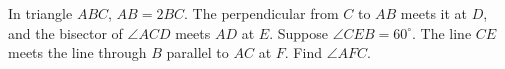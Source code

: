 In triangle $ABC$, $AB=2BC$. The perpendicular from $C$ to $AB$ meets it at $D$, and the bisector of $\angle ACD$ meets $AD$ at $E$. Suppose $\angle CEB=60^\circ$. The line $CE$ meets the line through $B$ parallel to $AC$ at $F$. Find $\angle AFC$.
